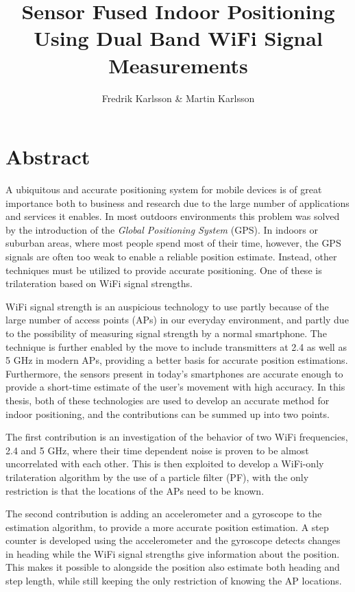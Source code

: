 \documentclass{LTHthesis}
\begin{document}
\begin{titlepages}
\author{Fredrik Karlsson \& Martin Karlsson}
\title{Sensor Fused Indoor Positioning Using Dual Band WiFi Signal Measurements}%
\end{titlepages}
\chapter*{Abstract}
A ubiquitous and accurate positioning system for mobile devices is of great importance both to business and research due to the large number of applications and services it enables. In most outdoors environments this problem was solved by the introduction of the \emph{Global Positioning System} (GPS). In indoors or suburban areas, where most people spend most of their time, however, the GPS signals are often too weak to enable a reliable position estimate. Instead, other techniques must be utilized to provide accurate positioning. One of these is trilateration based on WiFi signal strengths.

WiFi signal strength is an auspicious technology to use partly because of the large number of access points (APs) in our everyday environment, and partly due to the possibility of measuring signal strength by a normal smartphone. The technique is further enabled by the move to include transmitters at 2.4  as well as 5 GHz in modern APs, providing a better basis for accurate position estimations. Furthermore, the sensors present in today's smartphones are accurate enough to provide a short-time estimate of the user's movement with high accuracy. In this thesis, both of these technologies are used to develop an accurate method for indoor positioning, and the contributions can be summed up into two points.

The first contribution is an investigation of the behavior of two WiFi frequencies, 2.4 and 5 GHz, where their time dependent noise is proven to be almost uncorrelated with each other. This is then exploited to develop a WiFi-only trilateration algorithm by the use of a particle filter (PF), with the only restriction is that the locations of the APs need to be known. 

The second contribution is adding an accelerometer and a gyroscope to the estimation algorithm, to provide a more accurate position estimation. A step counter is developed using the accelerometer and the gyroscope detects changes in heading while the WiFi signal strengths give information about the position. This makes it possible to alongside the position also estimate both heading and step length, while still keeping the only restriction of knowing the AP locations.
    
\end{document}
